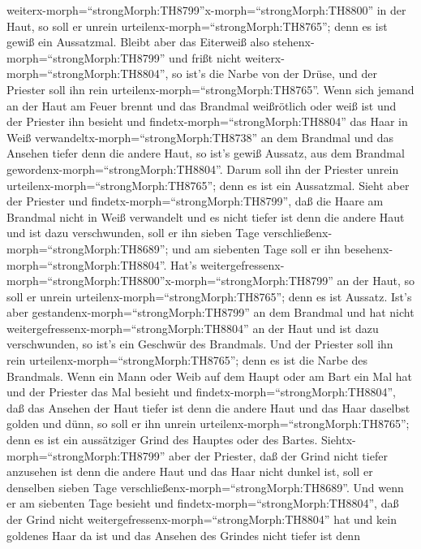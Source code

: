 weiterx-morph=``strongMorph:TH8799''x-morph=``strongMorph:TH8800'' in
der Haut, so soll er unrein urteilenx-morph=``strongMorph:TH8765''; denn
es ist gewiß ein Aussatzmal.  Bleibt aber das Eiterweiß
also stehenx-morph=``strongMorph:TH8799'' und frißt nicht
weiterx-morph=``strongMorph:TH8804'', so ist's die Narbe von der Drüse,
und der Priester soll ihn rein urteilenx-morph=``strongMorph:TH8765''.
 Wenn sich jemand an der Haut am Feuer brennt und das
Brandmal weißrötlich oder weiß ist  und der Priester ihn
besieht und findetx-morph=``strongMorph:TH8804'' das Haar in Weiß
verwandeltx-morph=``strongMorph:TH8738'' an dem Brandmal und das Ansehen
tiefer denn die andere Haut, so ist's gewiß Aussatz, aus dem Brandmal
gewordenx-morph=``strongMorph:TH8804''. Darum soll ihn der Priester
unrein urteilenx-morph=``strongMorph:TH8765''; denn es ist ein
Aussatzmal.  Sieht aber der Priester und
findetx-morph=``strongMorph:TH8799'', daß die Haare am Brandmal nicht in
Weiß verwandelt und es nicht tiefer ist denn die andere Haut und ist
dazu verschwunden, soll er ihn sieben Tage
verschließenx-morph=``strongMorph:TH8689'';  und am
siebenten Tage soll er ihn besehenx-morph=``strongMorph:TH8804''. Hat's
weitergefressenx-morph=``strongMorph:TH8800''x-morph=``strongMorph:TH8799''
an der Haut, so soll er unrein urteilenx-morph=``strongMorph:TH8765'';
denn es ist Aussatz.  Ist's aber
gestandenx-morph=``strongMorph:TH8799'' an dem Brandmal und hat nicht
weitergefressenx-morph=``strongMorph:TH8804'' an der Haut und ist dazu
verschwunden, so ist's ein Geschwür des Brandmals. Und der Priester soll
ihn rein urteilenx-morph=``strongMorph:TH8765''; denn es ist die Narbe
des Brandmals.  Wenn ein Mann oder Weib auf dem Haupt oder
am Bart ein Mal hat  und der Priester das Mal besieht und
findetx-morph=``strongMorph:TH8804'', daß das Ansehen der Haut tiefer
ist denn die andere Haut und das Haar daselbst golden und dünn, so soll
er ihn unrein urteilenx-morph=``strongMorph:TH8765''; denn es ist ein
aussätziger Grind des Hauptes oder des Bartes. 
Siehtx-morph=``strongMorph:TH8799'' aber der Priester, daß der Grind
nicht tiefer anzusehen ist denn die andere Haut und das Haar nicht
dunkel ist, soll er denselben sieben Tage
verschließenx-morph=``strongMorph:TH8689''.  Und wenn er am
siebenten Tage besieht und findetx-morph=``strongMorph:TH8804'', daß der
Grind nicht weitergefressenx-morph=``strongMorph:TH8804'' hat und kein
goldenes Haar da ist und das Ansehen des Grindes nicht tiefer ist denn

